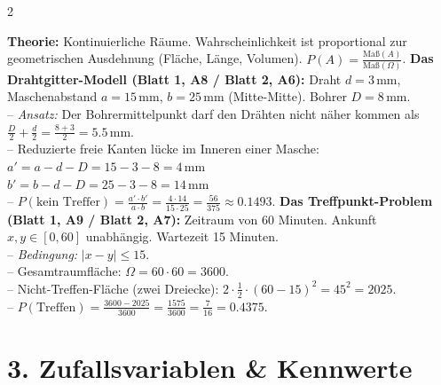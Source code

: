 \documentclass[a4paper, 9pt]{extarticle}
\begin{document}
\begin{multicols*}{2}
\begin{tcolorbox}[title={Geometrische Wahrscheinlichkeit}, colframe=probgreen, colback=probgreen!5, colbacktitle=probgreen]
\textbf{Theorie:} Kontinuierliche Räume. Wahrscheinlichkeit ist proportional zur geometrischen Ausdehnung (Fläche, Länge, Volumen). $P(A) = \frac{\text{Maß}(A)}{\text{Maß}(\Omega)}$.
\smallskip
\textbf{Das Drahtgitter-Modell (Blatt 1, A8 / Blatt 2, A6):} Draht $d=3$\,mm, Maschenabstand $a=15$\,mm, $b=25$\,mm (Mitte-Mitte). Bohrer $D=8$\,mm.
\\-- \textit{Ansatz:} Der Bohrermittelpunkt darf den Drähten nicht näher kommen als $\frac{D}{2} + \frac{d}{2} = \frac{8+3}{2} = 5.5$\,mm.
\\-- Reduzierte freie Kanten lücke im Inneren einer Masche:
\\$a' = a - d - D = 15 - 3 - 8 = 4$\,mm
\\$b' = b - d - D = 25 - 3 - 8 = 14$\,mm
\\-- $P(\text{kein Treffer}) = \frac{a' \cdot b'}{a \cdot b} = \frac{4 \cdot 14}{15 \cdot 25} = \frac{56}{375} \approx 0.1493$.
\smallskip
\textbf{Das Treffpunkt-Problem (Blatt 1, A9 / Blatt 2, A7):} Zeitraum von 60 Minuten. Ankunft $x, y \in [0,60]$ unabhängig. Wartezeit 15 Minuten.
\\-- \textit{Bedingung:} $|x - y| \le 15$.
\\-- Gesamtraumfläche: $\Omega = 60 \cdot 60 = 3600$.
\\-- Nicht-Treffen-Fläche (zwei Dreiecke): $2 \cdot \frac{1}{2} \cdot (60-15)^2 = 45^2 = 2025$.
\\-- $P(\text{Treffen}) = \frac{3600 - 2025}{3600} = \frac{1575}{3600} = \frac{7}{16} = 0.4375$.
\end{tcolorbox}

\section*{3. Zufallsvariablen \& Kennwerte}


\end{multicols*}
\end{document}
